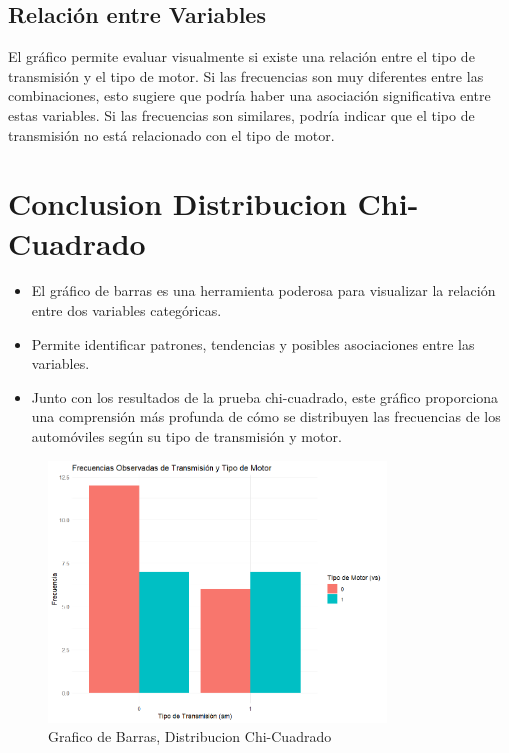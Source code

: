 \documentclass{article}
\begin{document}
\subsection{Relación entre Variables}
El gráfico permite evaluar visualmente si existe una relación entre el tipo de transmisión y el tipo de motor. Si las frecuencias son muy diferentes entre las combinaciones, esto sugiere que podría haber una asociación significativa entre estas variables. Si las frecuencias son similares, podría indicar que el tipo de transmisión no está relacionado con el tipo de motor.

\section{Conclusion Distribucion Chi-Cuadrado}
\begin{itemize}
    \item El gráfico de barras es una herramienta poderosa para visualizar la relación entre dos variables categóricas.
    \item Permite identificar patrones, tendencias y posibles asociaciones entre las variables.
    \item Junto con los resultados de la prueba chi-cuadrado, este gráfico proporciona una comprensión más profunda de cómo se distribuyen las frecuencias de los automóviles según su tipo de transmisión y motor.
\end{itemize}
\begin{figure}[h] %
    \centering %
    \includegraphics[width=0.8\textwidth]{Imagen2.png}
    \caption{Grafico de Barras, Distribucion Chi-Cuadrado} %
    \label{fig:mi_imagen} %
\end{figure}
\end{document}
